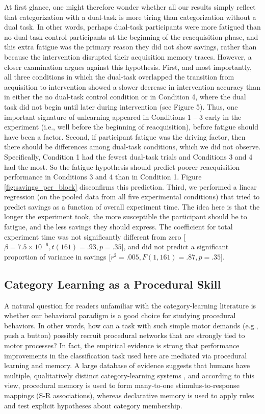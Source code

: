 \documentclass[man,apacite,draftfirst]{apa6}
\begin{document}
At first glance, one might therefore wonder whether all our results simply reflect that categorization with a dual-task is more tiring than categorization without a dual task. In other words, perhaps dual-task participants were more fatigued than no dual-task control participants at the beginning of the reacquisition phase, and this extra fatigue was the primary reason they did not show savings, rather than because the intervention disrupted their acquisition memory traces. However, a closer examination argues against this hypothesis. First, and most importantly, all three conditions in which the dual-task overlapped the transition from acquisition to intervention showed a slower decrease in intervention accuracy than in either the no dual-task control condition or in Condition 4, where the dual task did not begin until later during intervention (see Figure 5). Thus, one important signature of unlearning appeared in Conditions 1 -- 3 early in the experiment (i.e., well before the beginning of reacquisition), before fatigue should have been a factor. Second, if participant fatigue was the driving factor, then there should be differences among dual-task conditions, which we did not observe. Specifically, Condition 1 had the fewest dual-task trials and Conditions 3 and 4 had the most. So the fatigue hypothesis should predict poorer reacquisition performance in Conditions 3 and 4 than in Condition 1. Figure \ref{fig:savings_per_block} disconfirms this prediction. Third, we performed a linear regression (on the pooled data from all five experimental conditions) that tried to predict savings as a function of overall experiment time. The idea here is that the longer the experiment took, the more susceptible the participant should be to fatigue, and the less savings they should express. The coefficient for total experiment time was not significantly different from zero [$\beta=7.5 \times 10^{-6}, t(161)=.93, p=.35$], and did not predict a significant proportion of variance in savings [$r^2=.005, F(1,161)=.87, p=.35$].

\subsection*{Category Learning as a Procedural Skill}
A natural question for readers unfamiliar with the category-learning literature
is whether our behavioral paradigm is a good choice for studying procedural
behaviors. In other words, how can a task with such simple motor demands (e.g.,
push a button) possibly recruit procedural networks that are strongly tied to
motor processes? In fact, the empirical evidence is strong that performance
improvements in the classification task used here are mediated via procedural
learning and memory. A large database of evidence suggests that humans have
multiple, qualitatively distinct category-learning systems \cite{AshbyCOVIS1998,
AshbyMaddox2005, EricksonKruschke1998}, and according to this view, procedural
memory is used to form many-to-one stimulus-to-response mappings (S-R
associations), whereas declarative memory is used to apply rules and test
explicit hypotheses about category membership.
\end{document}

